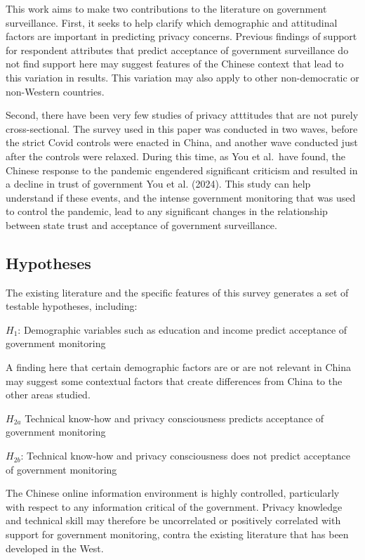 \documentclass[
  letterpaper,
  DIV=11,
  numbers=noendperiod]{scrartcl}
\begin{document}
This work aims to make two contributions to the literature on government
surveillance. First, it seeks to help clarify which demographic and
attitudinal factors are important in predicting privacy concerns.
Previous findings of support for respondent attributes that predict
acceptance of government surveillance do not find support here may
suggest features of the Chinese context that lead to this variation in
results. This variation may also apply to other non-democratic or
non-Western countries.

Second, there have been very few studies of privacy atttitudes that are
not purely cross-sectional. The survey used in this paper was conducted
in two waves, before the strict Covid controls were enacted in China,
and another wave conducted just after the controls were relaxed. During
this time, as You et al.~have found, the Chinese response to the
pandemic engendered significant criticism and resulted in a decline in
trust of government You et al. (2024). This study can help understand if
these events, and the intense government monitoring that was used to
control the pandemic, lead to any significant changes in the
relationship between state trust and acceptance of government
surveillance.

\subsection{Hypotheses}\label{hypotheses}

The existing literature and the specific features of this survey
generates a set of testable hypotheses, including:

\(H_1\): Demographic variables such as education and income predict
acceptance of government monitoring

A finding here that certain demographic factors are or are not relevant
in China may suggest some contextual factors that create differences
from China to the other areas studied.

\(H_{2a}\) Technical know-how and privacy consciousness predicts
acceptance of government monitoring

\(H_{2b}\): Technical know-how and privacy consciousness does not
predict acceptance of government monitoring

The Chinese online information environment is highly controlled,
particularly with respect to any information critical of the government.
Privacy knowledge and technical skill may therefore be uncorrelated or
positively correlated with support for government monitoring, contra the
existing literature that has been developed in the West.
\end{document}

